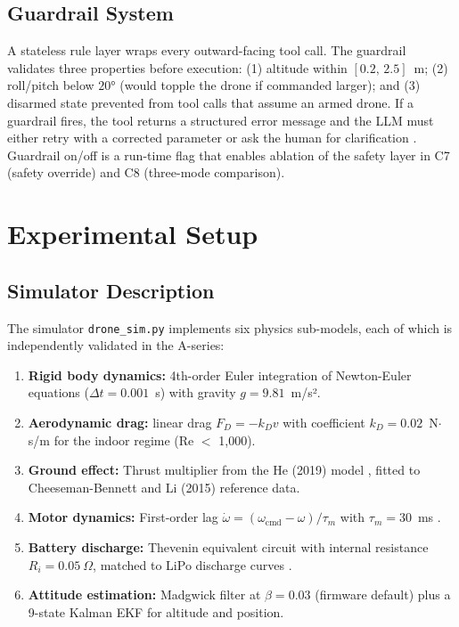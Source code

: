 \subsection{Guardrail System}
\label{sec:ch3_proposed_guardrails}

A stateless rule layer wraps every outward-facing tool call. The guardrail
validates three properties before execution: (1) altitude within
$[0.2,\,2.5]$~m; (2) roll/pitch below $20°$ (would topple the drone if
commanded larger); and (3) disarmed state prevented from tool calls that assume
an armed drone. If a guardrail fires, the tool returns a structured error message
and the LLM must either retry with a corrected parameter or ask the human for
clarification \cite{sanneman2022safeai}. Guardrail on/off is a run-time flag
that enables ablation of the safety layer in C7 (safety override) and C8
(three-mode comparison).


\section{Experimental Setup}
\label{sec:ch3_setup}

\subsection{Simulator Description}
\label{sec:ch3_setup_sim}

The simulator \texttt{drone\_sim.py} implements six physics sub-models, each
of which is independently validated in the A-series:

\begin{enumerate}
  \item \textbf{Rigid body dynamics:} 4th-order Euler integration of
        Newton-Euler equations ($\Delta t = 0.001$~s) with gravity $g=9.81$~m/s².
  \item \textbf{Aerodynamic drag:} linear drag $F_D = -k_D v$ with coefficient
        $k_D = 0.02$~N$\cdot$s/m for the indoor regime (Re $<$ 1,000).
  \item \textbf{Ground effect:} Thrust multiplier from the He (2019) model
        \cite{he2019groundeffect}, fitted to Cheeseman-Bennett \cite{cheeseman1955groundeffect}
        and Li (2015) \cite{li2015groundeffect} reference data.
  \item \textbf{Motor dynamics:} First-order lag $\dot{\omega} =
        (\omega_\text{cmd} - \omega)/\tau_m$ with $\tau_m = 30$~ms
        \cite{faessler2018differential, bangura2012thrustcontrol}.
  \item \textbf{Battery discharge:} Thevenin equivalent circuit with internal
        resistance $R_i = 0.05~\Omega$, matched to LiPo discharge curves
        \cite{sotogarcia2023battery, morbidi2018power}.
  \item \textbf{Attitude estimation:} Madgwick filter \cite{madgwick2010filter}
        at $\beta = 0.03$ (firmware default) plus a 9-state Kalman EKF
        \cite{kalman1960filter, welch1995kalman} for altitude and position.
\end{enumerate}

